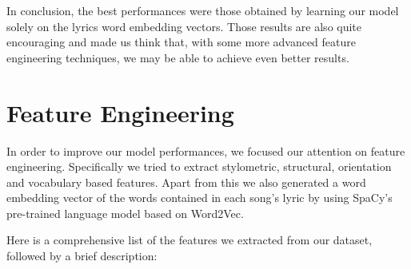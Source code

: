 In conclusion, the best performances were those obtained by learning our model solely on the lyrics word embedding vectors.
Those results are also quite encouraging and made us think that, with some more advanced feature engineering techniques,
we may be able to achieve even better results.

\section{Feature Engineering}
In order to improve our model performances, we focused our attention on feature engineering. Specifically we tried to extract stylometric, structural, orientation and vocabulary based features\cite{features}. Apart from this we also generated a word embedding vector of the words contained in each song's lyric by using SpaCy's\cite{spacy} pre-trained language model based on Word2Vec\cite{word2vec}.\par

Here is a comprehensive list of the features we extracted from our dataset, followed by a brief description:

